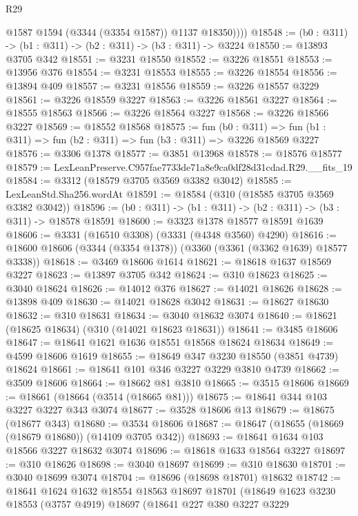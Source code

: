 \begin{lexlean}{R29}
\begin{coremodule}
            @1587
            @1594
            (@3344 (@3354 @1587))
            @1137
            @18350))))
@18548 := (b0 : @311) -> (b1 : @311) -> (b2 : @311) -> (b3 : @311) -> @3224
@18550 := @13893 @3705 @342
@18551 := @3231 @18550
@18552 := @3226 @18551
@18553 := @13956 @376
@18554 := @3231 @18553
@18555 := @3226 @18554
@18556 := @13894 @409
@18557 := @3231 @18556
@18559 := @3226 @18557 @3229
@18561 := @3226 @18559 @3227
@18563 := @3226 @18561 @3227
@18564 := @18555 @18563
@18566 := @3226 @18564 @3227
@18568 := @3226 @18566 @3227
@18569 := @18552 @18568
@18575 := fun (b0 : @311) =>
  fun (b1 : @311) => fun (b2 : @311) => fun (b3 : @311) => @3226 @18569 @3227
@18576 := @3306 @1378
@18577 := @3851 @13968
@18578 := @18576 @18577
@18579 := LexLeanPreserve.C957fae7733de71a8e9ca0df28d31cdad.R29.__fits_19
@18584 := @3312 (@18579 @3705 @3569 @3382 @3042)
@18585 := LexLeanStd.Sha256.wordAt
@18591 := @18584 (@310 (@18585 @3705 @3569 @3382 @3042))
@18596 := (b0 : @311) -> (b1 : @311) -> (b2 : @311) -> (b3 : @311) -> @18578 @18591
@18600 := @3323 @1378 @18577 @18591 @1639
@18606 := @3331 (@16510 @3308) (@3331 (@4348 @3560) @4290)
@18616 := @18600 @18606 (@3344 (@3354 @1378)) (@3360 (@3361 (@3362 @1639) @18577 @3338))
@18618 := @3469 @18606 @1614
@18621 := @18618 @1637 @18569 @3227
@18623 := @13897 @3705 @342
@18624 := @310 @18623
@18625 := @3040 @18624
@18626 := @14012 @376
@18627 := @14021 @18626
@18628 := @13898 @409
@18630 := @14021 @18628 @3042
@18631 := @18627 @18630
@18632 := @310 @18631
@18634 := @3040 @18632 @3074
@18640 := @18621 (@18625 @18634) (@310 (@14021 @18623 @18631))
@18641 := @3485 @18606
@18647 := @18641 @1621 @1636 @18551 @18568 @18624 @18634
@18649 := @4599 @18606 @1619
@18655 := @18649 @347 @3230 @18550 (@3851 @4739) @18624
@18661 := @18641 @101 @346 @3227 @3229 @3810 @4739
@18662 := @3509 @18606
@18664 := @18662 @81 @3810
@18665 := @3515 @18606
@18669 := @18661 (@18664 (@3514 (@18665 @81)))
@18675 := @18641 @344 @103 @3227 @3227 @343 @3074
@18677 := @3528 @18606 @13
@18679 := @18675 (@18677 @343)
@18680 := @3534 @18606
@18687 := @18647 (@18655 (@18669 (@18679 @18680)) (@14109 @3705 @342))
@18693 := @18641 @1634 @103 @18566 @3227 @18632 @3074
@18696 := @18618 @1633 @18564 @3227
@18697 := @310 @18626
@18698 := @3040 @18697
@18699 := @310 @18630
@18701 := @3040 @18699 @3074
@18704 := @18696 (@18698 @18701) @18632
@18742 := @18641
    @1624
    @1632
    @18554
    @18563
    @18697
    @18701
    (@18649
      @1623
      @3230
      @18553
      (@3757 @4919)
      @18697
      (@18641
        @227
        @380
        @3227
        @3229

\end{coremodule}
\end{lexlean}
